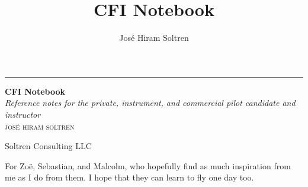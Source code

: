\documentclass[12pt,twoside,letterpaper]{report}
\author{Jos\'e Hiram Soltren}
\title{CFI Notebook}
\newenvironment{dedication}
  {\clearpage           %
   \thispagestyle{empty}%
   \vspace*{\stretch{1}}%
   \itshape             %
   \raggedleft          %
  }
  {\par %
   \vspace{\stretch{3}} %
   \clearpage           %
  }
\begin{document}


\begin{titlepage} %

\raggedleft %
\rule{1pt}{\textheight} %
\hspace{0.05\textwidth} %
\parbox[b]{0.75\textwidth}{ %
{\Huge\bfseries CFI Notebook}\\[2\baselineskip] %
{\large\textit{Reference notes for the private, instrument, and commercial pilot candidate and instructor}}\\[4\baselineskip] %
{\Large\textsc{jos\'e hiram soltren}} %

\vspace{0.5\textheight} %

{\noindent Soltren Consulting LLC}\\[\baselineskip] %
}

\end{titlepage}

\begin{dedication}
For Zo\"e, Sebastian, and Malcolm, who hopefully find as much inspiration from me
as I do from them. I hope that they can learn to fly one day too.
\end{dedication}



\tableofcontents





\printbibliography
\end{document}
